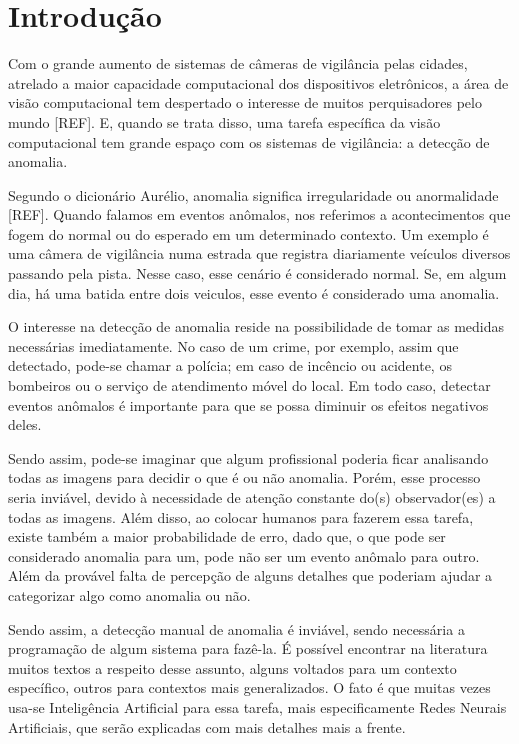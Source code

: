 \chapter{Introdução}\label{chp:INTRODUCAO}

Com o grande aumento de sistemas de câmeras de vigilância pelas cidades, atrelado a maior capacidade computacional dos dispositivos eletrônicos, a área de visão computacional tem despertado o interesse de muitos perquisadores pelo mundo [REF]. E, quando se trata disso, uma tarefa específica da visão computacional tem grande espaço com os sistemas de vigilância: a detecção de anomalia.

Segundo o dicionário Aurélio, anomalia significa irregularidade ou anormalidade [REF]. Quando falamos em eventos anômalos, nos referimos a acontecimentos que fogem do normal ou do esperado em um determinado contexto. Um exemplo é uma câmera de vigilância numa estrada que registra diariamente veículos diversos passando pela pista. Nesse caso, esse cenário é considerado normal. Se, em algum dia, há uma batida entre dois veiculos, esse evento é considerado uma anomalia.

O interesse na detecção de anomalia reside na possibilidade de tomar as medidas necessárias imediatamente. No caso de um crime, por exemplo, assim que detectado, pode-se chamar a polícia; em caso de incêncio ou acidente, os bombeiros ou o serviço de atendimento móvel do local. Em todo caso, detectar eventos anômalos é importante para que se possa diminuir os efeitos negativos deles.

Sendo assim, pode-se imaginar que algum profissional poderia ficar analisando todas as imagens para decidir o que é ou não anomalia. Porém, esse processo seria inviável, devido à necessidade de atenção constante do(s) observador(es) a todas as imagens. Além disso, ao colocar humanos para fazerem essa tarefa, existe também a maior probabilidade de erro, dado que, o que pode ser considerado anomalia para um, pode não ser um evento anômalo para outro. Além da provável falta de percepção de alguns detalhes que poderiam ajudar a categorizar algo como anomalia ou não.

Sendo assim, a detecção manual de anomalia é inviável, sendo necessária a programação de algum sistema para fazê-la. É possível encontrar na literatura muitos textos a respeito desse assunto, alguns voltados para um contexto específico, outros para contextos mais generalizados. O fato é que muitas vezes usa-se Inteligência Artificial para essa tarefa, mais especificamente Redes Neurais Artificiais, que serão explicadas com mais detalhes mais a frente.

